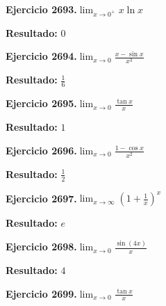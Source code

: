 \documentclass[10pt,a4paper]{article}
\begin{document}
\begin{ejbox}
\textbf{Ejercicio 2693.}\quad $\lim_{x\to 0^+} x\ln x$
\end{ejbox}

\begin{solbox}
\textbf{Resultado:} \(\displaystyle 0\)
\end{solbox}

\newpage
\begin{ejbox}
\textbf{Ejercicio 2694.}\quad $\lim_{x\to 0} \frac{x-\sin x}{x^3}$
\end{ejbox}

\begin{solbox}
\textbf{Resultado:} \(\displaystyle \frac{1}{6}\)
\end{solbox}

\begin{ejbox}
\textbf{Ejercicio 2695.}\quad $\lim_{x\to 0} \frac{\tan x}{x}$
\end{ejbox}

\begin{solbox}
\textbf{Resultado:} \(\displaystyle 1\)
\end{solbox}

\begin{ejbox}
\textbf{Ejercicio 2696.}\quad $\lim_{x\to 0} \frac{1-\cos x}{x^2}$
\end{ejbox}

\begin{solbox}
\textbf{Resultado:} \(\displaystyle \frac{1}{2}\)
\end{solbox}

\newpage
\begin{ejbox}
\textbf{Ejercicio 2697.}\quad $\lim_{x\to \infty} \left(1+\frac{1}{x}\right)^x$
\end{ejbox}

\begin{solbox}
\textbf{Resultado:} \(\displaystyle e\)
\end{solbox}

\begin{ejbox}
\textbf{Ejercicio 2698.}\quad $\lim_{x\to 0} \frac{\sin(4x)}{x}$
\end{ejbox}

\begin{solbox}
\textbf{Resultado:} \(\displaystyle 4\)
\end{solbox}

\begin{ejbox}
\textbf{Ejercicio 2699.}\quad $\lim_{x\to 0} \frac{\tan x}{x}$
\end{ejbox}
\end{document}

